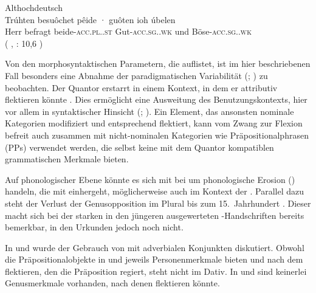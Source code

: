 \begin{exe}
\ex \label{ex:beidejohahd_2_copy}
	\langinfo%
		{Althochdeutsch}%
		{}%
		{\cite[35]{tax1979}}\\
	\gll Trúhten besuôchet pêide · guôten ioh úbelen \\
			Herr befragt beide-\textsc{acc.pl.\MascA.st} {}
				Gut-\textsc{acc.sg.\MascA.wk} und
				Böse-\textsc{acc.sg.\MascA.wk} \\
		\trans {}
			(%
				, : 10,6%
			)
\end{exe}

Von den morphosyntaktischen Parametern, die \citet[174]{lehmann2015} auflistet,
ist im hier beschriebenen Fall besonders eine Abnahme der
paradigmatischen Variabilität (;
\cite[146--150]{lehmann2015}) zu beobachten. Der Quantor erstarrt in einem
Kontext, in dem er attributiv flektieren könnte
. Dies ermöglicht eine Ausweitung des Benutzungskontexts,
hier vor allem in syntaktischer Hinsicht (; \cite[150--151]{lehmann2015}). Ein Element, das ansonsten
nominale Kategorien modifiziert und entsprechend flektiert, kann vom Zwang zur
Flexion befreit auch zusammen mit nicht-nominalen Kategorien wie
Präpositionalphrasen (PPs) verwendet werden, die selbst
keine mit dem Quantor kompatiblen grammatischen
Merkmale bieten.

Auf phonologischer Ebene könnte es sich mit \citet[134--136]{lehmann2015} bei
 um phonologische Erosion () handeln,
die mit  einhergeht, möglicherweise auch im Kontext
der  \autocite[89--93]{braune2023}. Parallel dazu
steht der Verlust der Genusopposition im Plural
bis zum 15.~Jahrhundert
\autocites[203]{paul2007}[191--192]{reichmannwegera1993}. Dieser macht sich bei
der starken  in den jüngeren ausgewerteten
\KC{}-Handschriften bereits bemerkbar, in den Urkunden jedoch noch
nicht.

In  und 
wurde der Gebrauch von  mit adverbialen Konjunkten
diskutiert. Obwohl die Präpositionalobjekte in  und
 jeweils Personenmerkmale
bieten und nach dem  flektieren, den die Präposition regiert, steht
  nicht im Dativ. In  und
 sind keinerlei Genusmerkmale
vorhanden, nach denen   flektieren könnte.

